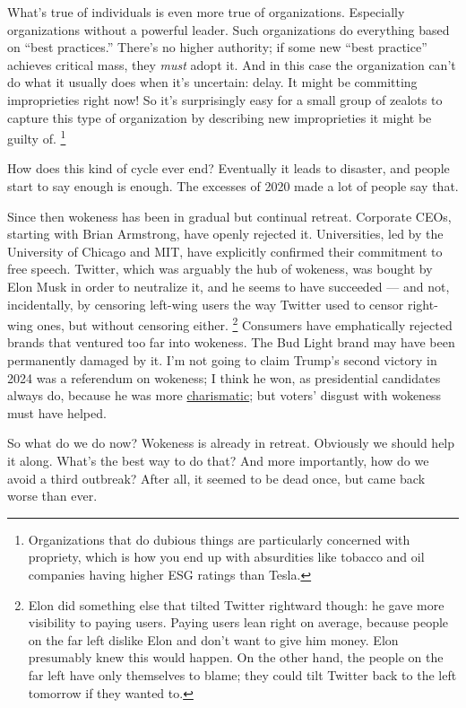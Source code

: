What's true of individuals is even more true of organizations.
Especially organizations without a powerful leader. Such organizations
do everything based on ``best practices.'' There's no higher authority;
if some new ``best practice'' achieves critical mass, they \emph{must}
adopt it. And in this case the organization can't do what it usually
does when it's uncertain: delay. It might be committing improprieties
right now! So it's surprisingly easy for a small group of zealots to
capture this type of organization by describing new improprieties it
might be guilty of. \footnote{Organizations that do dubious things are particularly concerned
with propriety, which is how you end up with absurdities like tobacco
and oil companies having higher ESG ratings than Tesla.}

How does this kind of cycle ever end? Eventually it leads to disaster,
and people start to say enough is enough. The excesses of 2020 made a
lot of people say that.

Since then wokeness has been in gradual but continual retreat. Corporate
CEOs, starting with Brian Armstrong, have openly rejected it.
Universities, led by the University of Chicago and MIT, have explicitly
confirmed their commitment to free speech. Twitter, which was arguably
the hub of wokeness, was bought by Elon Musk in order to neutralize it,
and he seems to have succeeded --- and not, incidentally, by censoring
left-wing users the way Twitter used to censor right-wing ones, but
without censoring either. \footnote{Elon did something else that tilted Twitter rightward though:
he gave more visibility to paying users. Paying users lean right on
average, because people on the far left dislike Elon and don't want to
give him money. Elon presumably knew this would happen. On the other
hand, the people on the far left have only themselves to blame; they
could tilt Twitter back to the left tomorrow if they wanted to.} Consumers have
emphatically rejected brands that ventured too far into wokeness. The
Bud Light brand may have been permanently damaged by it. I'm not going
to claim Trump's second victory in 2024 was a referendum on wokeness; I
think he won, as presidential candidates always do, because he was more
\href{charisma.html}{charismatic}; but voters' disgust with wokeness
must have helped.

So what do we do now? Wokeness is already in retreat. Obviously we
should help it along. What's the best way to do that? And more
importantly, how do we avoid a third outbreak? After all, it seemed to
be dead once, but came back worse than ever.

